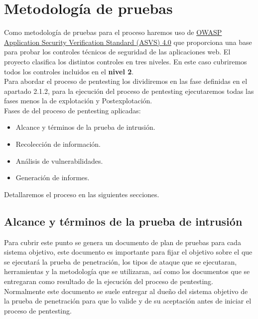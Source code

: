 \section{Metodología de pruebas} 
Como metodología de pruebas para el proceso haremos uso 
de \href{https://owasp.org/www-pdf-archive/OWASP_Application_Security_Verification_Standard_4.0-en.pdf}{OWASP Application Security Verification Standard (ASVS) 4.0} 
que proporciona una base para probar los controles técnicos de seguridad de las aplicaciones web. El proyecto clasifica
 los distintos controles en tres niveles. En este caso cubriremos todos los controles incluidos en el \textbf{nivel 2}.\\

 Para abordar el proceso de pentesting los dividiremos en las fase definidas en el 
 apartado 2.1.2, para la ejecución del proceso de pentesting ejecutaremos todas las fases menos la 
 de explotación y Postexplotación.\\

 Fases de del proceso de pentesting aplicadas:\\
 \begin{itemize}
     \item Alcance y términos de la prueba de intrusión.
     \item Recolección de información.
     \item Análisis de vulnerabilidades.
     \item Generación de informes.
 \end{itemize}
 
 Detallaremos el proceso en las siguientes secciones.

\newpage

\subsection{Alcance y términos de la prueba de intrusión}
Para cubrir este punto se genera un documento de plan de pruebas para cada sistema objetivo, este documento es 
importante para fijar el objetivo sobre el que se ejecutará la prueba de penetración, 
los tipos de ataque que se ejecutaran, herramientas y la metodología que se utilizaran, así como los documentos que se entregaran 
como resultado de la ejecución del proceso de pentesting.\\

Normalmente este documento se suele entregar al dueño del sistema objetivo de la prueba de penetración para que 
lo valide y de su aceptación antes de iniciar el proceso de pentesting.\\

